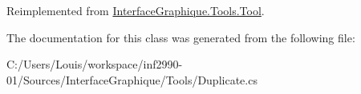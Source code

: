 Reimplemented from \hyperlink{class_interface_graphique_1_1_tools_1_1_tool_aedd1c93f96ee602475b7cbc3c9c99baa}{Interface\+Graphique.\+Tools.\+Tool}.



The documentation for this class was generated from the following file\+:\begin{DoxyCompactItemize}
\item 
C\+:/\+Users/\+Louis/workspace/inf2990-\/01/\+Sources/\+Interface\+Graphique/\+Tools/Duplicate.\+cs\end{DoxyCompactItemize}
